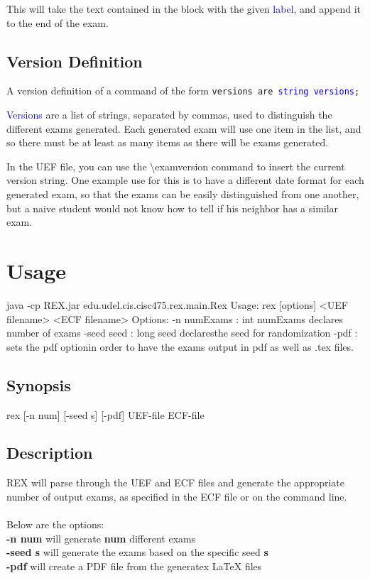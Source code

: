 \documentclass{article}
\begin{document}
This will take the text contained in the block with the given \textcolor{blue}{label}, and append it to the end of the exam.

\subsection{Version Definition}
A version definition of a command of the form \texttt{versions are \textcolor{blue}{string versions};}

\textcolor{blue}{Versions} are a list of strings, separated by commas, used to distinguish the different exams generated. Each generated exam will use one item in the list, and so there must be at least as many items as there will be exams generated. 

In the UEF file, you can use the \textbackslash{examversion} command to insert the current version string. One example use for this is to have a different date format for each generated exam, so that the exams can be easily distinguished from one another, but a naive student would not know how to tell if his neighbor has a similar exam.

\section{Usage}
java -cp REX.jar edu.udel.cis.cisc475.rex.main.Rex 
Usage: rex [options] <UEF filename> <ECF filename>
Options: 
    -n numExams : int numExams declares number of exams
    -seed seed : long seed declaresthe seed for randomization
    -pdf       : sets the pdf optionin order to have the exams output in pdf as well as .tex files.

\subsection{Synopsis}
rex [-n num] [-seed s] [-pdf] UEF-file ECF-file

\subsection{Description}
REX will parse through the UEF and ECF files and generate the appropriate number
of output exams, as specified in the ECF file or on the command line.
\\
\\
\noindent Below are the options:\\
\indent \textbf{-n num} will generate \textbf{num} different exams\\
\indent \textbf{-seed s} will generate the exams based on the specific seed \textbf{s}\\
\indent \textbf{-pdf} will create a PDF file from the generatex \LaTeX{} files\\
\end{document}
